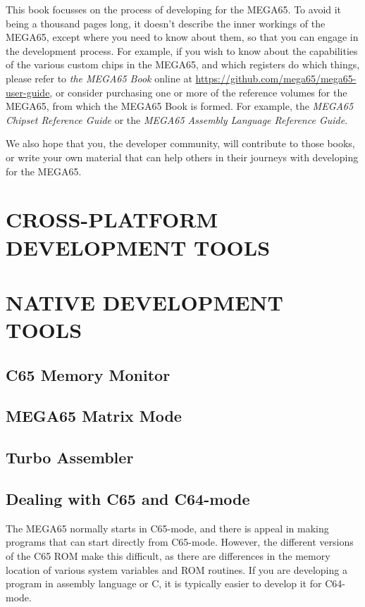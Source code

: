 This book focusses on the process of developing for the MEGA65.  To
avoid it being a thousand pages long, it doesn't describe the inner
workings of the MEGA65, except where you need to know about them, so
that you can engage in the development process.  For example, if you
wish to know about the capabilities of the various custom chips in the
MEGA65, and which registers do which things, please refer to {\em the
MEGA65 Book} online
at \url{https://github.com/mega65/mega65-user-guide}, or consider
purchasing one or more of the reference volumes for the MEGA65, from
which the MEGA65 Book is formed.  For example, the {\em MEGA65 Chipset
Reference Guide} or the {\em MEGA65 Assembly Language Reference Guide}.

We also hope that you, the developer community, will contribute to
those books, or write your own material that can help others in their
journeys with developing for the MEGA65.

\part{CROSS-PLATFORM DEVELOPMENT TOOLS}








\part{NATIVE DEVELOPMENT TOOLS}

\chapter{C65 Memory Monitor}

\chapter{MEGA65 Matrix Mode}

\chapter{Turbo Assembler}

\chapter{Dealing with C65 and C64-mode}

The MEGA65 normally starts in C65-mode, and there is appeal in making
programs that can start directly from C65-mode.  However, the
different versions of the C65 ROM make this difficult, as there are
differences in the memory location of various system variables and ROM
routines.  If you are developing a program in assembly language or
C, it is typically easier to develop it for C64-mode.

